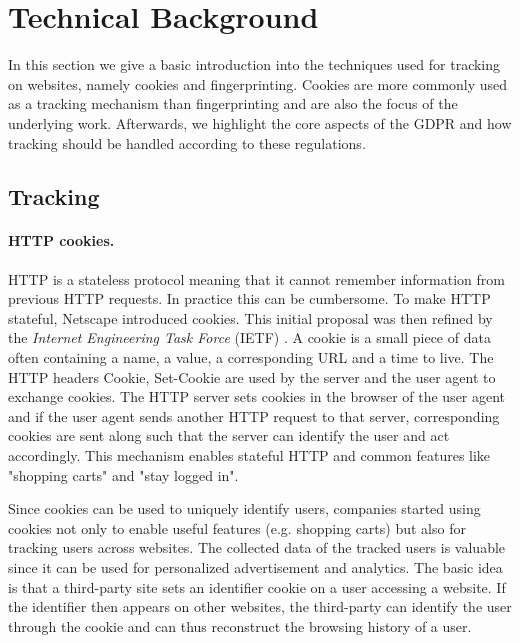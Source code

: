 \section{Technical Background}
\label{sec:background}

In this section we give a basic introduction into the techniques used for tracking on websites, namely cookies and
fingerprinting. Cookies are more commonly used as a tracking mechanism than fingerprinting and are also the focus of
the underlying work. Afterwards, we highlight
the core aspects of the GDPR and how tracking should be handled according to these regulations.

\subsection{Tracking}

\paragraph{HTTP cookies.}

HTTP is a stateless protocol meaning that it cannot remember information from previous HTTP requests. In practice this
can be cumbersome. To make HTTP stateful, Netscape introduced cookies. This initial proposal was then refined by the
\emph{Internet Engineering Task Force} (IETF) \cite{rfc6265}. A cookie is a small piece of data often containing a name,
a value, a corresponding URL and a time to live. The HTTP headers Cookie, Set-Cookie are used by the server and the user agent to
exchange cookies. The HTTP server sets cookies in the browser of the user agent and if the user agent sends another HTTP
request to that server, corresponding cookies are sent along such that the server can identify the user and act accordingly. This
mechanism enables stateful HTTP and common features like "shopping carts" and "stay logged in".

Since cookies can be used to uniquely identify users, companies started using cookies not only to enable useful features
(e.g. shopping carts) but also for tracking users across websites. The collected data of the tracked
users is valuable since it can be used for
personalized advertisement and analytics. The basic idea is that a third-party site sets an identifier cookie on a
user accessing a website. If the identifier then appears on other websites, the third-party can identify the user
through the cookie and can thus reconstruct the browsing history of a user.

